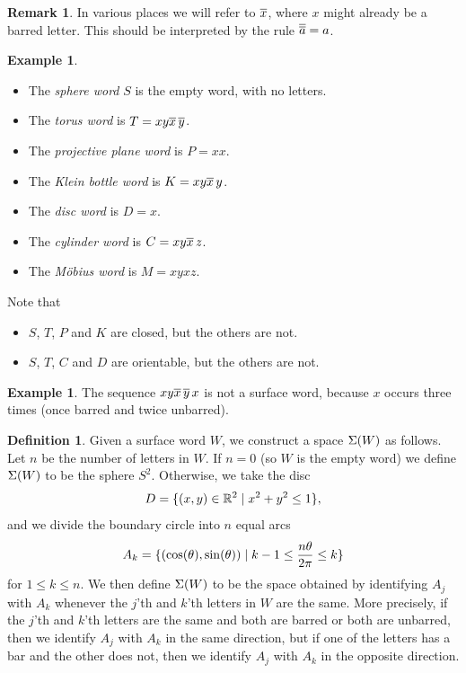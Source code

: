 \documentclass[reqno]{amsart}
\theoremstyle{definition}
\newtheorem{remark}[theorem]{Remark}
\newtheorem{definition}[theorem]{Definition}
\newtheorem{example}[theorem]{Example}
\begin{document}
\begin{remark}\label{rem-double-bar}
 In various places we will refer to $\overline{x}$, where $x$ might already be
 a barred letter.  This should be interpreted by the rule
 $\overline{\overline{a}}=a$.  
\end{remark}

\begin{example}\label{eg-standard-words}\leavevmode
 \begin{itemize}
  \item The \emph{sphere word} $S$ is the empty word, with no letters.
  \item The \emph{torus word} is $T=xy\overline{x}\,\overline{y}$.
  \item The \emph{projective plane word} is $P=xx$.
  \item The \emph{Klein bottle word} is $K=xy\overline{x}\,y$.
  \item The \emph{disc word} is $D=x$.
  \item The \emph{cylinder word} is $C=xy\overline{x}\,z$.
  \item The \emph{M\"obius word} is $M=xyxz$.
 \end{itemize}
 Note that 
 \begin{itemize}
  \item $S$, $T$, $P$ and $K$ are closed, but the others are not.
  \item $S$, $T$, $C$ and $D$ are orientable, but the others are not.
 \end{itemize}
\end{example}

\begin{example}\label{eg-non-word}
 The sequence $xy\overline{x}\,\overline{y}\,x$ is not a surface word, because $x$ occurs
 three times (once barred and twice unbarred).
\end{example}

\begin{definition}\label{defn-Sigma-W}
 Given a surface word $W$, we construct a space $\Sigma(W)$ as follows.
 Let $n$ be the number of letters in $W$.  If $n=0$ (so $W$ is the
 empty word) we define $\Sigma(W)$ to be the sphere $S^2$.  Otherwise, we
 take the disc 
 \[ D = \{(x,y)\in\mathbb{R}^2\;|\; x^2+y^2\leq 1\}, \]
 and we divide the boundary circle into $n$ equal arcs 
 \[ A_k =
     \{(\cos(\theta),\sin(\theta))\;|\; k-1\leq \frac{n\theta}{2\pi}\leq k\}
 \]
 for $1\leq k\leq n$.  We then define $\Sigma(W)$ to be the space
 obtained by identifying $A_j$ with $A_k$ whenever the $j$'th and
 $k$'th letters in $W$ are the same.  More precisely, if the $j$'th
 and $k$'th letters are the same and both are barred or both are
 unbarred, then we identify $A_j$ with $A_k$ in the same direction,
 but if one of the letters has a bar and the other does not, then we
 identify $A_j$ with $A_k$ in the opposite direction.
\end{definition}
\end{document}
